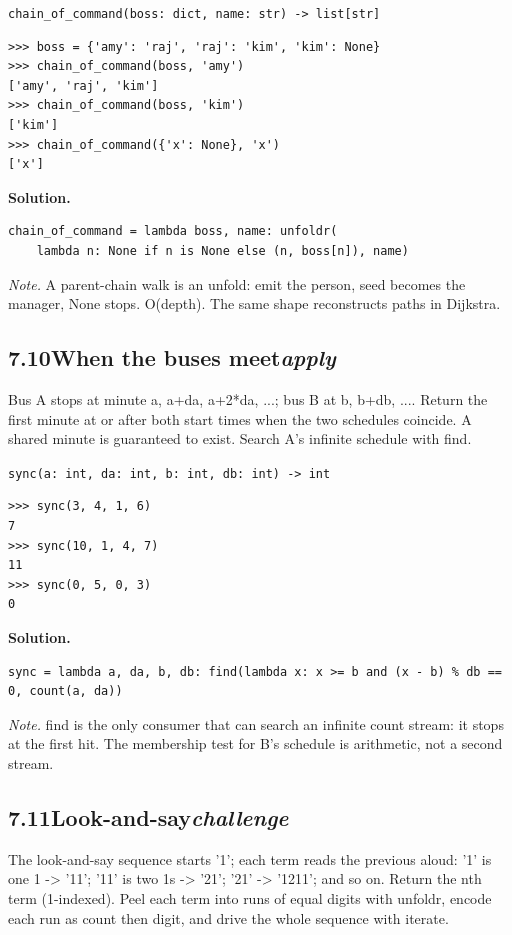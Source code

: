 \documentclass[10pt,letterpaper]{book}
\begin{document}
\noindent\texttt{chain\_of\_command(boss: dict, name: str) -> list[str]}
\begin{lstlisting}[style=ex]
>>> boss = {'amy': 'raj', 'raj': 'kim', 'kim': None}
>>> chain_of_command(boss, 'amy')
['amy', 'raj', 'kim']
>>> chain_of_command(boss, 'kim')
['kim']
>>> chain_of_command({'x': None}, 'x')
['x']
\end{lstlisting}
\noindent\textbf{Solution.}
\begin{lstlisting}[style=code]
chain_of_command = lambda boss, name: unfoldr(
    lambda n: None if n is None else (n, boss[n]), name)
\end{lstlisting}
\noindent\textit{Note.} A parent-chain walk is an unfold: emit the person, seed becomes the manager, None stops. O(depth). The same shape reconstructs paths in Dijkstra.

\subsection*{7.10\quad When the buses meet\hfill\textnormal{\textit{apply}}}
Bus A stops at minute a, a+da, a+2*da, ...; bus B at b, b+db, .... Return the first minute at or after both start times when the two schedules coincide. A shared minute is guaranteed to exist. Search A's infinite schedule with find.

\noindent\texttt{sync(a: int, da: int, b: int, db: int) -> int}
\begin{lstlisting}[style=ex]
>>> sync(3, 4, 1, 6)
7
>>> sync(10, 1, 4, 7)
11
>>> sync(0, 5, 0, 3)
0
\end{lstlisting}
\noindent\textbf{Solution.}
\begin{lstlisting}[style=code]
sync = lambda a, da, b, db: find(lambda x: x >= b and (x - b) % db == 0, count(a, da))
\end{lstlisting}
\noindent\textit{Note.} find is the only consumer that can search an infinite count stream: it stops at the first hit. The membership test for B's schedule is arithmetic, not a second stream.

\subsection*{7.11\quad Look-and-say\hfill\textnormal{\textit{challenge}}}
The look-and-say sequence starts '1'; each term reads the previous aloud: '1' is one 1 -> '11'; '11' is two 1s -> '21'; '21' -> '1211'; and so on. Return the nth term (1-indexed). Peel each term into runs of equal digits with unfoldr, encode each run as count then digit, and drive the whole sequence with iterate.
\end{document}
